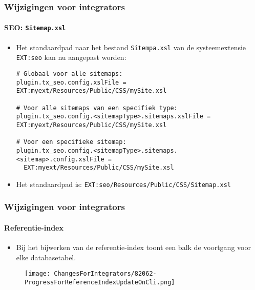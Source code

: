 
\begin{frame}[fragile]
	\frametitle{Wijzigingen voor integrators}
	\framesubtitle{SEO: \texttt{Sitemap.xsl}}

	\lstset{basicstyle=\tiny\ttfamily}

	\begin{itemize}
		\item Het standaardpad naar het bestand \texttt{Sitempa.xsl} van de systeemextensie
			\texttt{EXT:seo} kan nu aangepast worden:

\vspace{-0.4cm}
\begin{lstlisting}
# Globaal voor alle sitemaps:
plugin.tx_seo.config.xslFile = EXT:myext/Resources/Public/CSS/mySite.xsl

# Voor alle sitemaps van een specifiek type:
plugin.tx_seo.config.<sitemapType>.sitemaps.xslFile = EXT:myext/Resources/Public/CSS/mySite.xsl

# Voor een specifieke sitemap:
plugin.tx_seo.config.<sitemapType>.sitemaps.<sitemap>.config.xslFile =
  EXT:myext/Resources/Public/CSS/mySite.xsl
\end{lstlisting}

		\item Het standaardpad is:\newline
			\smaller
				\texttt{EXT:seo/Resources/Public/CSS/Sitemap.xsl}
			\normalsize

	\end{itemize}

\end{frame}


\begin{frame}[fragile]
	\frametitle{Wijzigingen voor integrators}
	\framesubtitle{Referentie-index}

	\lstset{basicstyle=\tiny\ttfamily}

	\begin{itemize}
		\item Bij het bijwerken van de referentie-index toont een balk de voortgang voor elke
			databasetabel.
	\end{itemize}

	\begin{figure}
		\texttt{[image: ChangesForIntegrators/82062-ProgressForReferenceIndexUpdateOnCli.png]}
	\end{figure}

\end{frame}

